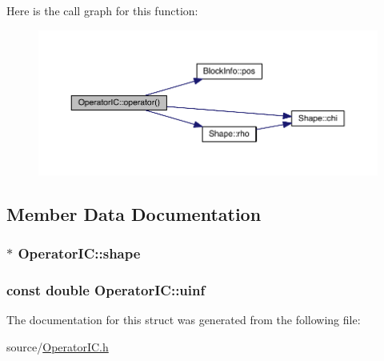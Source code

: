 Here is the call graph for this function\+:\nopagebreak
\begin{figure}[H]
\begin{center}
\leavevmode
\includegraphics[width=350pt]{da/d91/struct_operator_i_c_adf547defe5168b4bb0181df741a71144_cgraph}
\end{center}
\end{figure}




\subsection{Member Data Documentation}
\hypertarget{struct_operator_i_c_ae12dfb693c37fcff020dbd7c6ae637cd}{}
\subsubsection[{shape}]{$\ast$ Operator\+I\+C\+::shape}\label{struct_operator_i_c_ae12dfb693c37fcff020dbd7c6ae637cd}
\hypertarget{struct_operator_i_c_ae9c336ea8e41f02409bf2680b0242c7f}{}
\subsubsection[{uinf}]{\setlength{\rightskip}{0pt plus 5cm}const double Operator\+I\+C\+::uinf}\label{struct_operator_i_c_ae9c336ea8e41f02409bf2680b0242c7f}


The documentation for this struct was generated from the following file\+:\begin{DoxyCompactItemize}
\item 
source/\hyperlink{_operator_i_c_8h}{Operator\+I\+C.\+h}\end{DoxyCompactItemize}
